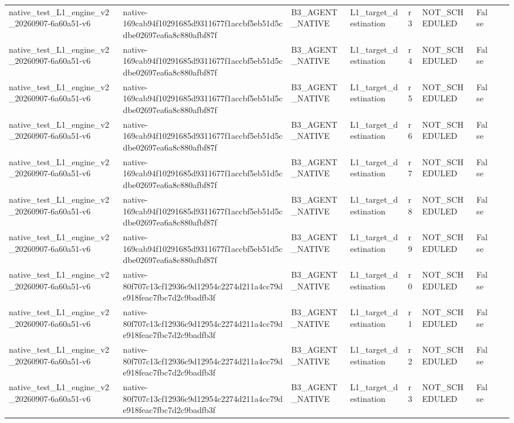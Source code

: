 \begin{tabular}{lllllllll}
native\_test\_L1\_engine\_v2\_20260907-6a60a51-v6 & native-169cab94f10291685d9311677f1accbf5eb51d5cdbe02697ea6a8c880afbf87f & B3\_AGENT\_NATIVE & L1\_target\_destination & r3 & NOT\_SCHEDULED & False &  &  \\
native\_test\_L1\_engine\_v2\_20260907-6a60a51-v6 & native-169cab94f10291685d9311677f1accbf5eb51d5cdbe02697ea6a8c880afbf87f & B3\_AGENT\_NATIVE & L1\_target\_destination & r4 & NOT\_SCHEDULED & False &  &  \\
native\_test\_L1\_engine\_v2\_20260907-6a60a51-v6 & native-169cab94f10291685d9311677f1accbf5eb51d5cdbe02697ea6a8c880afbf87f & B3\_AGENT\_NATIVE & L1\_target\_destination & r5 & NOT\_SCHEDULED & False &  &  \\
native\_test\_L1\_engine\_v2\_20260907-6a60a51-v6 & native-169cab94f10291685d9311677f1accbf5eb51d5cdbe02697ea6a8c880afbf87f & B3\_AGENT\_NATIVE & L1\_target\_destination & r6 & NOT\_SCHEDULED & False &  &  \\
native\_test\_L1\_engine\_v2\_20260907-6a60a51-v6 & native-169cab94f10291685d9311677f1accbf5eb51d5cdbe02697ea6a8c880afbf87f & B3\_AGENT\_NATIVE & L1\_target\_destination & r7 & NOT\_SCHEDULED & False &  &  \\
native\_test\_L1\_engine\_v2\_20260907-6a60a51-v6 & native-169cab94f10291685d9311677f1accbf5eb51d5cdbe02697ea6a8c880afbf87f & B3\_AGENT\_NATIVE & L1\_target\_destination & r8 & NOT\_SCHEDULED & False &  &  \\
native\_test\_L1\_engine\_v2\_20260907-6a60a51-v6 & native-169cab94f10291685d9311677f1accbf5eb51d5cdbe02697ea6a8c880afbf87f & B3\_AGENT\_NATIVE & L1\_target\_destination & r9 & NOT\_SCHEDULED & False &  &  \\
native\_test\_L1\_engine\_v2\_20260907-6a60a51-v6 & native-80f707c13cf12936c9d12954c2274d211a4cc79de918feac7fbc7d2c9badfb3f & B3\_AGENT\_NATIVE & L1\_target\_destination & r0 & NOT\_SCHEDULED & False &  &  \\
native\_test\_L1\_engine\_v2\_20260907-6a60a51-v6 & native-80f707c13cf12936c9d12954c2274d211a4cc79de918feac7fbc7d2c9badfb3f & B3\_AGENT\_NATIVE & L1\_target\_destination & r1 & NOT\_SCHEDULED & False &  &  \\
native\_test\_L1\_engine\_v2\_20260907-6a60a51-v6 & native-80f707c13cf12936c9d12954c2274d211a4cc79de918feac7fbc7d2c9badfb3f & B3\_AGENT\_NATIVE & L1\_target\_destination & r2 & NOT\_SCHEDULED & False &  &  \\
native\_test\_L1\_engine\_v2\_20260907-6a60a51-v6 & native-80f707c13cf12936c9d12954c2274d211a4cc79de918feac7fbc7d2c9badfb3f & B3\_AGENT\_NATIVE & L1\_target\_destination & r3 & NOT\_SCHEDULED & False &  &  \\

\end{tabular}
